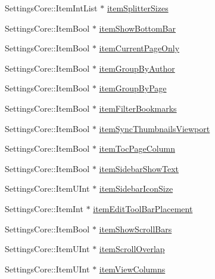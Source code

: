 \begin{DoxyCompactItemize}
\item 
Settings\+Core\+::\+Item\+Int\+List $\ast$ \hyperlink{classOkular_1_1SettingsPrivate_ad5b9f93017723ca704825f3bc5a97088}{item\+Splitter\+Sizes}
\item 
Settings\+Core\+::\+Item\+Bool $\ast$ \hyperlink{classOkular_1_1SettingsPrivate_a0808b4fe0b5d77a1a1b1df04b8883aae}{item\+Show\+Bottom\+Bar}
\item 
Settings\+Core\+::\+Item\+Bool $\ast$ \hyperlink{classOkular_1_1SettingsPrivate_ad0d5cbc1d3c00e0f1008fa7cf5248f5b}{item\+Current\+Page\+Only}
\item 
Settings\+Core\+::\+Item\+Bool $\ast$ \hyperlink{classOkular_1_1SettingsPrivate_a57a785999d9858210969231df3bcaa09}{item\+Group\+By\+Author}
\item 
Settings\+Core\+::\+Item\+Bool $\ast$ \hyperlink{classOkular_1_1SettingsPrivate_adcb32a4d1392e9650541dfbbf7b22dff}{item\+Group\+By\+Page}
\item 
Settings\+Core\+::\+Item\+Bool $\ast$ \hyperlink{classOkular_1_1SettingsPrivate_a75423605407f669f478df13cf97265a0}{item\+Filter\+Bookmarks}
\item 
Settings\+Core\+::\+Item\+Bool $\ast$ \hyperlink{classOkular_1_1SettingsPrivate_a86acbdfc27d562a3ba7c66b821b1f3d1}{item\+Sync\+Thumbnails\+Viewport}
\item 
Settings\+Core\+::\+Item\+Bool $\ast$ \hyperlink{classOkular_1_1SettingsPrivate_ab294003c378fb7baf06b6de74950a085}{item\+Toc\+Page\+Column}
\item 
Settings\+Core\+::\+Item\+Bool $\ast$ \hyperlink{classOkular_1_1SettingsPrivate_ae1d4c31efa5f316584412c99d6e10bff}{item\+Sidebar\+Show\+Text}
\item 
Settings\+Core\+::\+Item\+U\+Int $\ast$ \hyperlink{classOkular_1_1SettingsPrivate_a215c33520932cea9ea809c3434198080}{item\+Sidebar\+Icon\+Size}
\item 
Settings\+Core\+::\+Item\+Int $\ast$ \hyperlink{classOkular_1_1SettingsPrivate_a75b021bc97a8a2eb940ff849575e3c5c}{item\+Edit\+Tool\+Bar\+Placement}
\item 
Settings\+Core\+::\+Item\+Bool $\ast$ \hyperlink{classOkular_1_1SettingsPrivate_af6978684b7cec666e2687e10cea23584}{item\+Show\+Scroll\+Bars}
\item 
Settings\+Core\+::\+Item\+U\+Int $\ast$ \hyperlink{classOkular_1_1SettingsPrivate_a94f89e7be20cbb40594e9a029f6e5951}{item\+Scroll\+Overlap}
\item 
Settings\+Core\+::\+Item\+U\+Int $\ast$ \hyperlink{classOkular_1_1SettingsPrivate_ad9434765834a0e3d0b1a20668baa905c}{item\+View\+Columns}

\end{DoxyCompactItemize}
